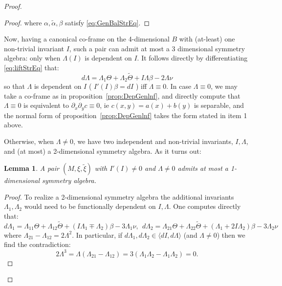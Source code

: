 \documentclass[10pt]{amsart}
\newcommand{\del}{\partial}
\newtheorem{lem}[thm]{Lemma}
\theoremstyle{definition}
\begin{document}
\begin{proof}
\begin{proof}
    where $\alpha, \tilde\alpha, \beta$ satisfy \eqref{eq:GenBalStrEq}.
    \end{proof}
    Now, having a canonical co-frame on the 4-dimensional $B$ with (at-least) one non-trivial invariant $I$, such a pair can admit at most a 3 dimensional symmetry algebra: only when $\Lambda(I)$ is dependent on $I$. It follows directly by differentiating \eqref{eq:liftStrEq} that:
    \[ d\Lambda = \Lambda_1 \Theta + \Lambda_2\tilde\Theta + I\Lambda\beta - 2\Lambda\nu \]
    so that $\Lambda$ is dependent on $I$ ( $I'(I)\beta = dI$ ) iff $\Lambda\equiv 0$. In case $\Lambda\equiv 0$, we may take a co-frame as in proposition~\ref{prop:DepGenlnf}, and directly compute that $\Lambda\equiv 0$ is equivalent to $\del_x\del_y c \equiv 0$, ie $c(x,y) = a(x) + b(y)$ is separable, and the normal form of proposition~\ref{prop:DepGenlnf} takes the form stated in item 1 above.

    
    Otherwise, when $\Lambda\ne 0$, we have two independent and non-trivial invariants, $I, \Lambda$, and (at most) a 2-dimensional symmetry algebra. As it turns out:
    \begin{lem}
        A pair $(M, \xi, \tilde\xi)$ with $I'(I)\ne 0$ and $\Lambda\ne 0$ admits at most a 1-dimensional symmetry algebra.
    \end{lem}
    \begin{proof}
        To realize a 2-dimensional symmetry algebra the additional invariants $\Lambda_1, \Lambda_2$ would need to be functionally dependent on $I, \Lambda$.
    One computes directly that:
    \[ d\Lambda_1 = \Lambda_{11}\Theta + \Lambda_{12}\tilde\Theta + (I\Lambda_1 \mp \Lambda_2) \beta - 3\Lambda_1\nu, ~~ d\Lambda_2 = \Lambda_{21}\Theta + \Lambda_{22} \tilde\Theta + (\Lambda_1 + 2I\Lambda_2)\beta - 3\Lambda_2\nu \]
where $\Lambda_{21} - \Lambda_{12} = 2 \Lambda^2$.
In particular, if $d\Lambda_1, d\Lambda_2 \in \langle dI, d\Lambda\rangle$ (and $\Lambda\ne 0$) then we find the contradiction:
\[ 2\Lambda^3 = \Lambda(\Lambda_{21} - \Lambda_{12}) = 3( \Lambda_1\Lambda_2 - \Lambda_1\Lambda_2) = 0. \]
    \end{proof}


\end{proof}
\end{document}
